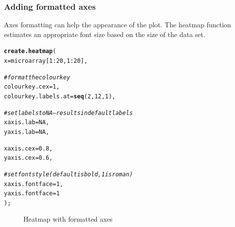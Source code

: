 \documentclass[letterpaper]{report}\usepackage[]{graphicx}\usepackage[]{color}
\makeatletter
\newcommand{\hlnum}[1]{\textcolor[rgb]{0.686,0.059,0.569}{#1}}%
\newcommand{\hlcom}[1]{\textcolor[rgb]{0.678,0.584,0.686}{\textit{#1}}}%
\newcommand{\hlopt}[1]{\textcolor[rgb]{0,0,0}{#1}}%
\newcommand{\hlstd}[1]{\textcolor[rgb]{0.345,0.345,0.345}{#1}}%
\newcommand{\hlkwc}[1]{\textcolor[rgb]{0.333,0.667,0.333}{#1}}%
\newcommand{\hlkwd}[1]{\textcolor[rgb]{0.737,0.353,0.396}{\textbf{#1}}}%
\newenvironment{kframe}{%
 \def\at@end@of@kframe{}%
 \ifinner\ifhmode%
  \def\at@end@of@kframe{\end{minipage}}%
  \begin{minipage}{\columnwidth}%
 \fi\fi%
 \def\FrameCommand##1{\hskip\@totalleftmargin \hskip-\fboxsep
 \colorbox{shadecolor}{##1}\hskip-\fboxsep
     \hskip-\linewidth \hskip-\@totalleftmargin \hskip\columnwidth}%
 \MakeFramed {\advance\hsize-\width
   \@totalleftmargin\z@ \linewidth\hsize
   \@setminipage}}%
 {\par\unskip\endMakeFramed%
 \at@end@of@kframe}
\newenvironment{knitrout}{}{} %
\makeatother
\begin{document}
\subsubsection{Adding formatted axes}
Axes formatting can help the appearance of the plot. The heatmap function estimates an appropriate font size based on the size of the data set.
\begin{knitrout}
\color{fgcolor}\begin{kframe}
\begin{alltt}
\hlkwd{create.heatmap}\hlstd{(}
    \hlkwc{x} \hlstd{= microarray[}\hlnum{1}\hlopt{:}\hlnum{20}\hlstd{,} \hlnum{1}\hlopt{:}\hlnum{20}\hlstd{],}

    \hlcom{# format the colour key}
    \hlkwc{colourkey.cex} \hlstd{=} \hlnum{1}\hlstd{,}
    \hlkwc{colourkey.labels.at} \hlstd{=} \hlkwd{seq}\hlstd{(}\hlnum{2}\hlstd{,} \hlnum{12}\hlstd{,} \hlnum{1}\hlstd{),}

    \hlcom{# set labels to NA -- results in default labels}
    \hlkwc{xaxis.lab} \hlstd{=} \hlnum{NA}\hlstd{,}
    \hlkwc{yaxis.lab} \hlstd{=} \hlnum{NA}\hlstd{,}

    \hlkwc{xaxis.cex} \hlstd{=} \hlnum{0.8}\hlstd{,}
    \hlkwc{yaxis.cex} \hlstd{=} \hlnum{0.6}\hlstd{,}

    \hlcom{# set font style (default is bold, 1 is roman)}
    \hlkwc{xaxis.fontface} \hlstd{=} \hlnum{1}\hlstd{,}
    \hlkwc{yaxis.fontface} \hlstd{=} \hlnum{1}
    \hlstd{);}
\end{alltt}
\end{kframe}\begin{figure}

{\centering {} 

}

\caption[Heatmap with formatted axes]{Heatmap with formatted axes}\label{fig:heatmap2}
\end{figure}


\end{knitrout}
\end{document}
